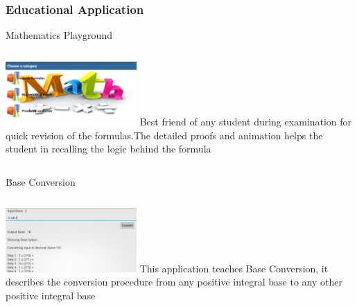 \documentclass[12pt]{beamer}
\begin{document}
\begin{frame}[c]
\frametitle{Educational Application}
\begin{block}{Mathematics Playground}
 \begin{columns}[c]
   \includegraphics[width=5cm]{images/screen3.png}
Best friend of any student during examination for quick revision of the formulas.The detailed proofs and animation helps the student in recalling the logic behind the formula
 \end{columns}
\end{block}

\begin{block}{Base Conversion}
 \begin{columns}[c]
   \includegraphics[width=5cm]{images/screen4.png}
This application teaches Base Conversion, it describes the conversion procedure from any positive integral base to any other positive integral base
 \end{columns}
\end{block}
\end{frame}
\end{document}
